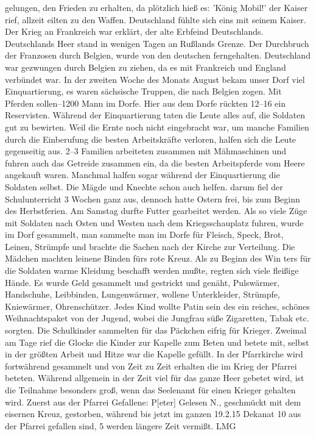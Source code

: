 

gelungen, den Frieden zu erhalten, da plötzlich hieß es: 'König Mobil!'\ob
der Kaiser rief, allzeit eilten zu den Waffen. Deutschland fühlte sich eins\ob
mit seinem Kaiser. Der Krieg an Frankreich war erklärt, der alte Erbfeind\ob
Deutschlands. Deutschlands Heer stand in wenigen Tagen an Rußlands Grenze.\ob
Der Durchbruch der Franzosen durch Belgien, wurde von den\ob
deutschen ferngehalten. Deutschland war gezwungen durch Belgien zu\ob
ziehen, da es mit Frankreich und England verbündet war. In der zweiten\ob
Woche des Monats August bekam unser Dorf viel Einquartierung, es\ob
waren sächsische Truppen, die nach Belgien zogen. Mit Pferden sollen--1200 Mann im Dorfe. Hier aus dem Dorfe rückten 12--16 ein Reservisten.\ob
Während der Einquartierung taten die Leute alles auf, die Soldaten gut\ob
zu bewirten. Weil die Ernte noch nicht eingebracht war, um manche Familien\ob
durch die Einberufung die besten Arbeitskräfte verloren, halfen sich die Leute\ob
gegenseitig aus. 2--3 Familien arbeiteten zusammen mit Mähmaschinen und\ob
fuhren auch das Getreide zusammen ein, da die besten Arbeitspferde vom Heere\ob
angekauft waren. Manchmal halfen sogar während der Einquartierung die\ob
Soldaten selbst. Die Mägde und Knechte schon auch helfen. darum fiel der\ob
Schulunterricht 3 Wochen ganz aus, dennoch hatte Ostern frei, bis zum Beginn\ob
des Herbstferien. Am Samstag durfte Futter gearbeitet werden. Als so viele\ob
Züge mit Soldaten nach Osten und Westen nach dem Kriegsschauplatz fuhren,\ob
wurde im Dorf\unsicher{} gesammelt, man sammelte man im Dorfe für Fleisch, Speck,\ob
Brot, Leinen, Strümpfe und brachte die Sachen nach der Kirche zur Verteilung.\ob
Die Mädchen machten leinene Binden fürs rote Kreuz. Als zu Beginn des Win\ohb
ters für die Soldaten warme Kleidung beschafft werden mußte, regten sich\ob
viele fleißige Hände. Es wurde Geld gesammelt und gestrickt und genäht,\ob
Pulswärmer, Handschuhe, Leibbinden, Lungenwärmer, wollene Unterkleider, Strümpfe,\ob
Kniewärmer, Ohrenschützer. Jedes Kind wollte Patin sein des\unsicher\ob
ein reiches, schönes Weihnachtspaket von der Jugend, wobei die Jungfrau süße\ob
Zigaretten, Tabak etc. sorgten. Die Schulkinder sammelten für das Päckchen eifrig\ob
für Krieger. Zweimal am Tage rief die Glocke die Kinder zur Kapelle zum Beten\ob
und betete mit, selbst in der größten Arbeit und Hitze war die Kapelle gefüllt.\ob
In der Pfarrkirche wird fortwährend gesammelt und von Zeit zu Zeit erhalten\ob
die im Krieg der Pfarrei beteten. Während allgemein in der Zeit viel für das\ob
ganze Heer gebetet wird, ist die Teilnahme besonders groß, wenn das Seelenamt\ob
für einen Krieger gehalten wird. Zuerst aus der Pfarrei Gefallene: P{[eter]}
Gelesen      N.\unsicher, geschmückt mit dem eisernen Kreuz, gestorben, während bis jetzt im ganzen
19.2.15      Dekanat 10 aus der Pfarrei gefallen sind, 5 werden längere Zeit vermißt.\ob
LMG
\pend

